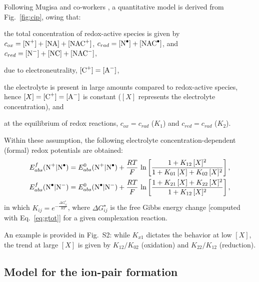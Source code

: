 \documentclass[review]{elsarticle}
\begin{document}
Following Mugisa and co-workers \cite{mugisaEffectIonparingKinetics2024}, a quantitative model is derived from Fig.~\ref{fig:cip}, owing that: \begin{inparaenum}[(i)]
	\item the total concentration of redox-active species is given by $c_{ox} = [\ce{N+}] + [\ce{NA}] + [\ce{NAC+}]$, $c_{rad} = [\ce{N^.}] + [\ce{NAC^.}]$, and $c_{red} =  [\ce{N-}] + [\ce{NC}] + [\ce{NAC-}]$,
	\item due to electroneutrality, $ [\ce{C+}] = [\ce{A-}] $,
	\item the electrolyte is present in large amounts compared to redox-active species, hence $[X] = [\ce{C+}] = [\ce{A-}] $ is constant ($[X]$ represents the electrolyte concentration), and
	\item at the equilibrium of redox reactions, $c_{ox} = c_{rad}$ ($K_1$) and $c_{red} = c_{rad}$ ($K_2$).
\end{inparaenum}
Within these assumption, the following electrolyte concentration-dependent (formal) redox potentials are obtained:\begin{align}
	E^f_{abs}(\ce{N+|N^.}) &= E^0_ {abs}(\ce{N+|N^.})+\frac{RT}{F}\,\ln\left[\frac{1+K_{12}\,[X]^2}{1+K_{01}\,[X]+K_{02}\,[X]^2}\right],\\
	E^f_{abs}(\ce{N^.|N-}) &= E^0_ {abs}(\ce{N^.|N-})+\frac{RT}{F}\,\ln\left[\frac{1+K_{21}\,[X]+K_{22}\,[X]^2}{1+K_{12}\,[X]^2}\right],
\end{align}
in which $K_{ij}= e^{-\frac{\Delta G_{ij}^\star}{RT}}$, where $\Delta G_{ij}^\star$ is the free Gibbs energy change [computed with Eq.~\eqref{eq:gtot}] for a given complexation reaction.

An example is provided in Fig.~S2: while $K_{x1}$ dictates the behavior at low $[X]$, the trend at large $[X]$ is given by $K_{12} / K_{02}$ (oxidation) and $K_{22} / K_{12}$ (reduction).

\subsection{Model for the ion-pair formation}
\end{document}
